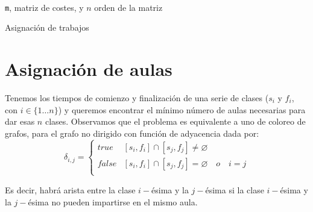\documentclass[a4paper, 11pt]{article} %
\let\emptyset\varnothing
\begin{document}
		\begin{algorithm}[H]
			\begin{algorithmic}[1]
				\REQUIRE \ \\
					\texttt{m}, matriz de costes, y $n$ orden de la matriz\\
			           	     \ENDIF
			           	   \ENDIF
			             \ENDFOR
			           \ENDIF
			         \ENDFOR
			       \ENDFOR  	
				        
			\end{algorithmic}
			   \caption{Asignación de trabajos}
			   \label{Asignación Global}
		\end{algorithm}
		
\section{Asignación de aulas}
Tenemos los tiempos de comienzo y finalización de una serie de clases
($s_i$ y $f_i$, con $i\in\{1\ldots n\}$) y queremos encontrar el mínimo número de aulas necesarias
para dar esas $n$ clases.
Observamos que el problema es equivalente a uno de coloreo de grafos, para
el grafo no dirigido con función de adyacencia dada por:
$$\delta_{i,j}=\left\{\begin{array}{ll}
  true  & [s_i,f_i] \cap [s_j,f_j] \neq \emptyset \\
  false  & [s_i,f_i]\cap[s_j,f_j] = \emptyset\quad o\quad i=j\\
  \end{array}\right.$$

Es decir, habrá arista entre la clase $i-$ésima y la $j-$ésima si la
clase $i-$ésima y la $j-$ésima no pueden impartirse en el mismo aula.
\end{document}
